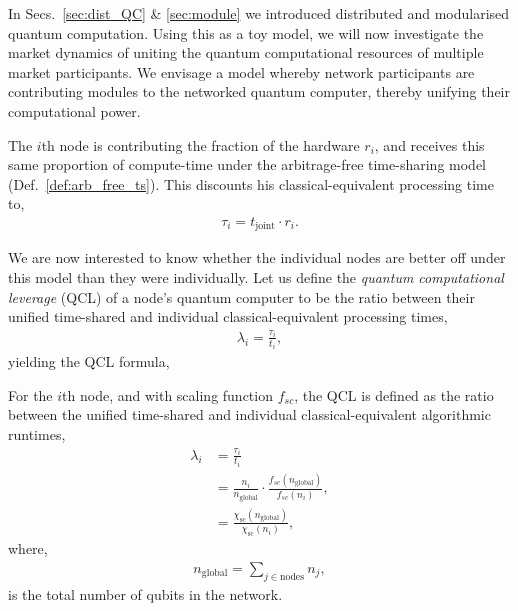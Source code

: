 In Secs.~\ref{sec:dist_QC} \& \ref{sec:module} we introduced distributed and modularised quantum computation. Using this as a toy model, we will now investigate the market dynamics of uniting the quantum computational resources of multiple market participants. We envisage a model whereby network participants are contributing modules to the networked quantum computer, thereby unifying their computational power.

The $i$th node is contributing the fraction of the hardware $r_i$, and receives this same proportion of compute-time under the arbitrage-free time-sharing model (Def.~\ref{def:arb_free_ts}). This discounts his classical-equivalent processing time to,
\begin{align}
\tau_i = t_\text{joint} \cdot r_i.
\end{align}

We are now interested to know whether the individual nodes are better off under this model than they were individually. Let us define the \textit{quantum computational leverage} (QCL) of a node's quantum computer to be the ratio between their unified time-shared and individual classical-equivalent processing times,
\begin{align}
\lambda_i = \frac{\tau_i}{t_i},
\end{align}
yielding the QCL formula,

\begin{definition} \label{def:quant_econ_lev}
For the $i$th node, and with scaling function $f_{sc}$, the QCL is defined as the ratio between the unified time-shared and individual classical-equivalent algorithmic runtimes,
\begin{align}
\lambda_i &= \frac{\tau_i}{t_i} \nonumber \\
&= \frac{n_i}{n_\text{global}} \cdot \frac{f_{sc}(n_\text{global})}{f_{sc}(n_i)}, \nonumber \\
&= \frac{\chi_\text{sc}(n_\text{global})}{\chi_\text{sc}(n_i)},
\end{align}
where,
\begin{align}
	n_\text{global} = \sum_{j\in \text{nodes}} n_j,
\end{align}
is the total number of qubits in the network.
\end{definition}

